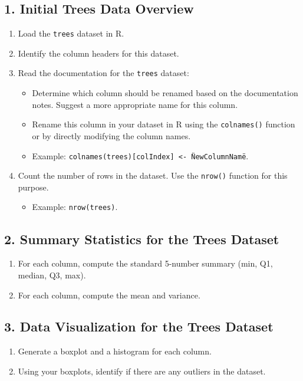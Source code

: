\documentclass{article}
\begin{document}
\subsection*{1. Initial Trees Data Overview}
\begin{enumerate}
    \item Load the \texttt{trees} dataset in R.
    \item Identify the column headers for this dataset.
    \item Read the documentation for the \texttt{trees} dataset:
    \begin{itemize}
        \item Determine which column should be renamed based on the documentation notes. Suggest a more appropriate name for this column.
        \item Rename this column in your dataset in R using the \texttt{colnames()} function or by directly modifying the column names.
        \item Example: \texttt{colnames(trees)[colIndex] <- \"NewColumnName\"}.
    \end{itemize}
    \item Count the number of rows in the dataset. Use the \texttt{nrow()} function for this purpose.
    \begin{itemize}
        \item Example: \texttt{nrow(trees)}.
    \end{itemize}
\end{enumerate}




\subsection*{2. Summary Statistics for the Trees Dataset}
\begin{enumerate}
    \item For each column, compute the standard 5-number summary (min, Q1, median, Q3, max).
    \item For each column, compute the mean and variance.
\end{enumerate}

\subsection*{3. Data Visualization for the Trees Dataset}
\begin{enumerate}
    \item Generate a boxplot and a histogram for each column.
    \item Using your boxplots, identify if there are any outliers in the dataset.
\end{enumerate}
\end{document}
